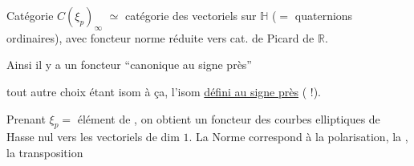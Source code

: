 Catégorie $C(\xi_p)_\infty$  $\simeq$ catégorie des vectoriels   sur
$\mathbb H$ ($=$ quaternions ordinaires), avec
 foncteur norme
réduite vers cat. de Picard de $\mathbb R$.

Ainsi il y a un foncteur ``canonique au signe près''



tout autre choix étant isom
à ça, l'isom \uline{défini au signe près} ( !).

Prenant $\xi_p=$ élément de , on obtient un
foncteur  des courbes elliptiques de Hasse nul
vers les vectoriels  de dim $1$. La  Norme
correspond à la polarisation, la , la transposition
